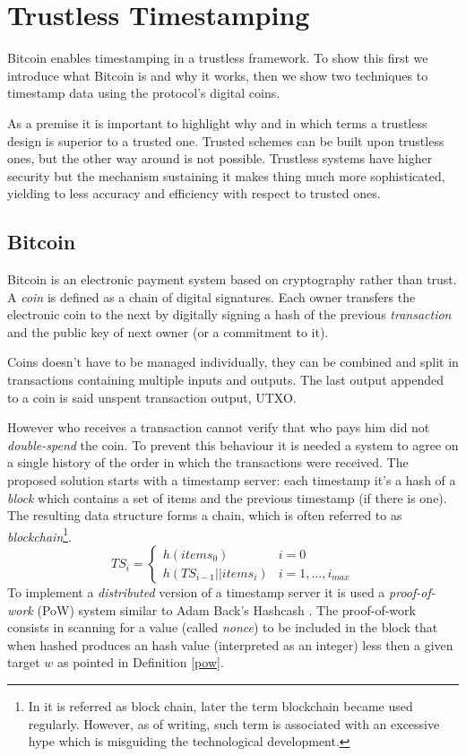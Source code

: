 \chapter{Trustless Timestamping}
\label{chpr:trustless}
Bitcoin enables timestamping in a trustless framework. 
To show this first we introduce what Bitcoin is and why it works, then we show two techniques to timestamp data using the protocol's digital coins.

As a premise it is important to highlight why and in which terms a trustless design is superior to a trusted one. 
Trusted schemes can be built upon trustless ones, but the other way around is not possible. 
Trustless systems have higher security but the mechanism sustaining it makes thing much more sophisticated, yielding to less accuracy and efficiency with respect to trusted ones.

\section{Bitcoin}
Bitcoin is an electronic payment system based on cryptography rather than trust. A \textit{coin} is defined as a chain of digital signatures. Each owner transfers the electronic coin to the next by digitally signing a hash of the previous \textit{transaction} and the public key of next owner (or a commitment to it).

Coins doesn't have to be managed individually, they can be combined and split in transactions containing multiple inputs and outputs. The last output appended to a coin is said unspent transaction output, UTXO.

However who receives a transaction cannot verify that who pays him did not \textit{double-spend} the coin. 
To prevent this behaviour it is needed a system to agree on a single history of the order in which the transactions were received. The proposed solution starts with a timestamp server: each timestamp it's a hash of a \textit{block} which contains a set of items and the previous timestamp (if there is one). The resulting data structure forms a chain, which is often referred to as \textit{blockchain}\footnote{In \cite{Nakamoto_bitcoin:a} it is referred as block chain, later the term blockchain became used regularly. However, as of writing, such term is associated with an excessive hype which is misguiding the technological development.}. 
\begin{equation}
	TS_i =
	\begin{cases} 
		h(items_0) & i=0\\ 
		h(TS_{i-1} || items_i) & i=1, ..., i_{max} 
	\end{cases}
\end{equation}
To implement a \textit{distributed} version of a timestamp server it is used a \textit{proof-of-work} (PoW) system similar to Adam Back's Hashcash \cite{Back02hashcash-}. The proof-of-work consists in scanning for a value (called \textit{nonce}) to be included in the block that when hashed produces an hash value (interpreted as an integer) less then a given target $w$ as pointed in Definition \ref{pow}.


